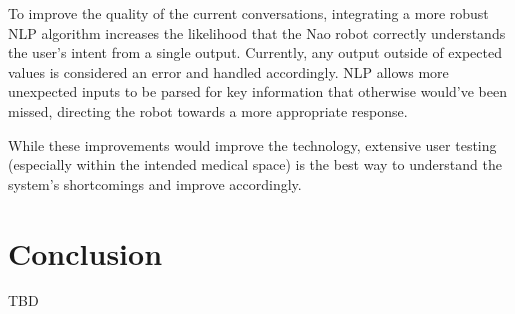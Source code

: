 \documentclass[conference]{IEEEtran}
\begin{document}
To improve the quality of the current conversations, integrating a more robust NLP algorithm increases the likelihood that the Nao 
robot correctly understands the user’s intent from a single output. Currently, any output outside of expected values is considered 
an error and handled accordingly. NLP allows more unexpected inputs to be parsed for key information that otherwise would’ve been 
missed, directing the robot towards a more appropriate response.

While these improvements would improve the technology, extensive user testing (especially within the intended medical space) is the 
best way to understand the system's shortcomings and improve accordingly.


\section{Conclusion}

TBD



\end{document}
